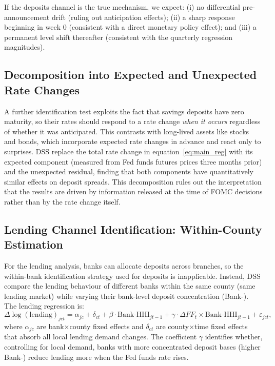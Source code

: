 \documentclass[12pt,a4paper]{article}
\newcommand{\HHI}{\text{HHI}}
\begin{document}
If the deposits channel is the true mechanism, we expect: (i) no differential
pre-announcement drift (ruling out anticipation effects); (ii) a sharp
response beginning in week 0 (consistent with a direct monetary policy
effect); and (iii) a permanent level shift thereafter (consistent with the
quarterly regression magnitudes).

\subsection{Decomposition into Expected and Unexpected Rate Changes}

A further identification test exploits the fact that savings deposits have
zero maturity, so their rates should respond to a rate change \emph{when it
occurs} regardless of whether it was anticipated. This contrasts with long-lived
assets like stocks and bonds, which incorporate expected rate changes in advance
and react only to surprises. DSS replace the total rate change in
equation~\eqref{eq:main_reg} with its expected component (measured from Fed
funds futures prices three months prior) and the unexpected residual, finding
that both components have quantitatively similar effects on deposit spreads.
This decomposition rules out the interpretation that the results are driven by
information released at the time of FOMC decisions rather than by the rate
change itself.

\subsection{Lending Channel Identification: Within-County Estimation}

For the lending analysis, banks can allocate deposits across branches, so the
within-bank identification strategy used for deposits is inapplicable. Instead,
DSS compare the lending behaviour of different banks within the same county
(same lending market) while varying their bank-level deposit concentration
(Bank-\HHI). The lending regression is:
\begin{equation}
  \Delta \log(\text{lending})_{jct} = \alpha_{jc} + \delta_{ct}
  + \beta \cdot \text{Bank-HHI}_{jt-1}
  + \gamma \cdot \Delta FF_t \times \text{Bank-HHI}_{jt-1}
  + \varepsilon_{jct},
  \label{eq:lending_reg}
\end{equation}
where $\alpha_{jc}$ are bank$\times$county fixed effects and $\delta_{ct}$ are
county$\times$time fixed effects that absorb all local lending demand changes.
The coefficient $\gamma$ identifies whether, controlling for local demand,
banks with more concentrated deposit bases (higher Bank-\HHI) reduce lending
more when the Fed funds rate rises.
\end{document}
